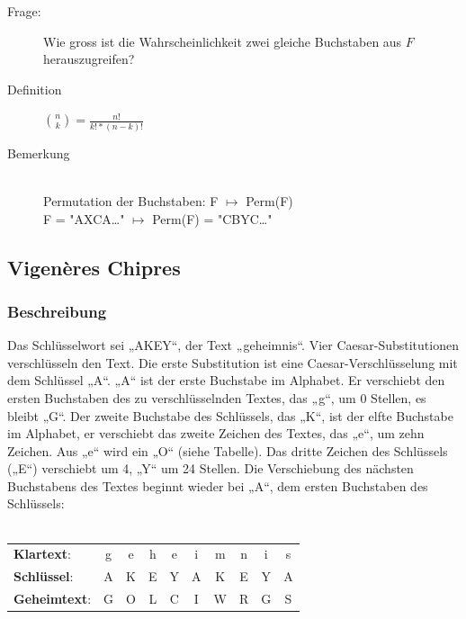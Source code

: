 \documentclass[10pt]{article}
\newcommand{\Sum}[2]{\sum_{#2}^{#1}} %
\begin{document}
\begin{description}
	\item[Frage:] Wie gross ist die Wahrscheinlichkeit zwei gleiche Buchstaben aus $F$ herauszugreifen?
	\item[Definition] \fbox{$\mathbf{IC_F}=\frac{\Sum{26}{1}{n_i\choose2}}{{n\choose2}}$} {\color{gray}${n \choose k}=\frac{n!}{k!*(n-k)!}$}

	\item[Bemerkung] \hfill \\
		Permutation der Buchstaben: F $\mapsto$ Perm(F)  \\
		F = "{}AXCA\dots" $\mapsto$ Perm(F) = "{}CBYC\dots" \\
		
\end{description}

\subsection{Vigenères Chipres}
\subsubsection{Beschreibung}
Das Schlüsselwort sei „AKEY“, der Text „geheimnis“. Vier Caesar-Substitutionen verschlüsseln den Text. Die erste Substitution ist eine Caesar-Verschlüsselung mit dem Schlüssel „A“. „A“ ist der erste Buchstabe im Alphabet. Er verschiebt den ersten Buchstaben des zu verschlüsselnden Textes, das „g“, um 0 Stellen, es bleibt „G“. Der zweite Buchstabe des Schlüssels, das „K“, ist der elfte Buchstabe im Alphabet, er verschiebt das zweite Zeichen des Textes, das „e“, um zehn Zeichen. Aus „e“ wird ein „O“ (siehe Tabelle). Das dritte Zeichen des Schlüssels („E“) verschiebt um 4, „Y“ um 24 Stellen. Die Verschiebung des nächsten Buchstabens des Textes beginnt wieder bei „A“, dem ersten Buchstaben des Schlüssels: \\ \\
\begin{tabular}{l c c c c c c c c c }
	\textbf{Klartext}: & g & e & h & e & i & m & n & i & s \\
	\textbf{Schlüssel}: & A & K & E & Y & A & K & E & Y & A \\
	\textbf{Geheimtext}: & G & O & L & C & I & W & R & G & S 
\end{tabular}
\end{document}
